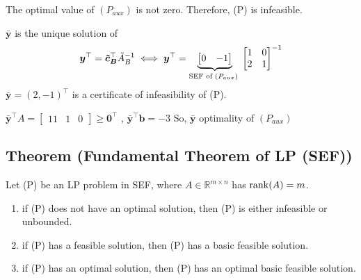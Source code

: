 The optimal value of $ (P_{aux}) $ is not zero. Therefore, (P) is
infeasible.

$ \bm{\bar{y}} $ is the unique solution of 
\[ \bm{y}^\top =\bm{\tilde{c}_B}^\top\tilde{A}_B^{-1} \iff 
\bm{y}^\top
=
\underbrace{\begin{bmatrix}0 & -1\end{bmatrix}}_
    {\text{SEF of $ (P_{aux}) $ }}
\begin{bmatrix}
    1 & 0\\
    2 & 1
\end{bmatrix}^{-1}
\]
$ \bm{\bar{y}}=(2,-1)^\top $
is a certificate of infeasibility of (P).

$ \bm{\bar{y}}^\top  A 
= \begin{bmatrix}11 & 1 & 0 \end{bmatrix}\ge \bm{0}^\top $ ,
$ \bm{\bar{y}}^\top \bm{b}=-3 $
So, $ \bm{\bar{y}} $ optimality of $ (P_{aux}) $

\begin{thmbox}
    \subsection{Theorem (Fundamental Theorem of LP (SEF))}
    Let (P) be an LP problem in SEF, where $ A\in \mathbb{R}^{m\times n} $ has $ \operatorname{rank}(A)=m $.
    \begin{enumerate}[(1)]
        \item if (P) does not have an optimal solution, then (P) is either infeasible or unbounded.
        \item if (P) has a feasible solution, then (P) has a basic feasible solution.
        \item if (P) has an optimal solution, then (P) has an optimal basic feasible solution.
    \end{enumerate}
\end{thmbox}